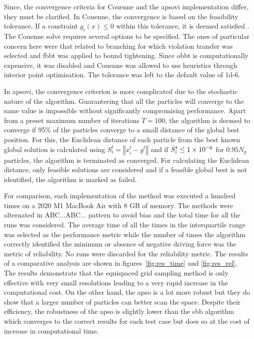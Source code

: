 	Since, the convergence criteria for Couenne and the \gls{apsovi} implementation differ, they must be clarified. In Couenne, the convergence is based on the feasibility tolerance. If a constraint $g_i(x) \leq 0$ within this tolerance, it is deemed satisfied \cite{Belotti:2022aa}. The Couenne solve requires several options to be specified. The ones of particular concern here were that related to branching for which violation transfer was selected and \gls{fbbt} was applied to bound tightening. Since \gls{obbt} is computationally expensive, it was disabled and Couenne was allowed to use heuristics through interior point optimisation. The tolerance was left to the default value of \num{1d-6}.
	
	In \gls{apsovi}, the convergence criterion is more complicated due to the stochastic nature of the algorithm. Guaranteeing that all the particles will converge to the same value is impossible without significantly compromising performance. Apart from a preset maximum number of iterations $T = 100$, the algorithm is deemed to converge if 95\% of the particles converge to a small distance of the global best position. For this, the Euclidean distance of each particle from the best known global solution is calculated using $S_i^t = \left \Vert x_i^t - g^t\right \Vert$ and if $S_i^t \leq {\num{1d-6}}$ for $0.95 N_p$ particles, the algorithm is terminated as converged. For calculating the Euclidean distance, only feasible solutions are considered and if a feasible global best is not identified, the algorithm is marked as failed.
	
	For comparison, each implementation of the method was executed a hundred times on a 2020 M1 MacBook Air with 8 GB of memory. The methods were alternated in ABC...ABC... pattern to avoid bias and the total time for all the runs was considered. The average time of all the times in the interquartile range was selected as the performance metric while the number of times the algorithm correctly identified the minimum or absence of negative driving force was the metric of reliability. No runs were discarded for the reliability metric. The results of a comparative analysis are shown in figures~\ref{fig:res_time} and \ref{fig:res_rel}. The results demonstrate that the equispaced grid sampling method is only effective with very small resolutions leading to a very rapid increase in the computational cost. On the other hand, the \gls{apso} is a lot more robust but they do show that a larger number of particles can better scan the space. Despite their efficiency, the robustness of the \gls{apso} is slightly lower than the \gls{sbb} algorithm which converges to the correct results for each test case but does so at the cost of increase in computational time. 

